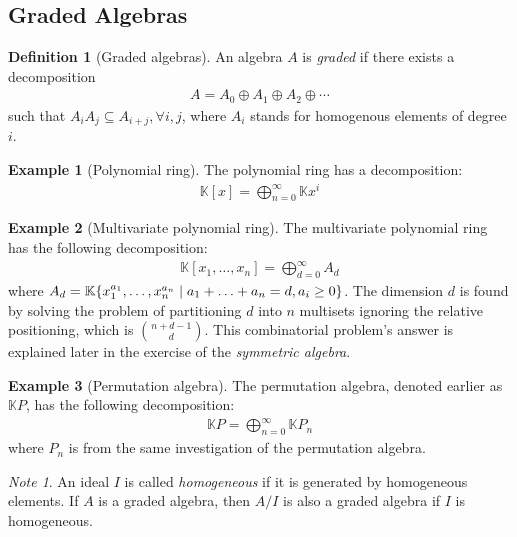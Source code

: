\documentclass{article}
\theoremstyle{definition}
\newtheorem{Definition}{Definition}
\newtheorem*{Example*}{Example}
\theoremstyle{remark}
\newtheorem*{Note*}{Note}
\theoremstyle{underline}
\theoremstyle{underline}
\begin{document}
	\subsection{Graded Algebras}

	\begin{Definition}[Graded algebras]
		An algebra $A$ is \emph{graded} if there exists a decomposition
		\begin{gather*}
			A = A_0 \oplus A_1 \oplus A_2 \oplus \cdots
		\end{gather*}
		such that $A_i A_j \subseteq A_{i+j}, \forall i,j$, where $A_i$ stands for homogenous elements of degree $i$.
	\end{Definition}

	\begin{Example*}[Polynomial ring]
		The polynomial ring has a decomposition:
		\begin{gather*}
			\mathbb K[x] = \bigoplus_{n=0}^{\infty} \mathbb K x^i
		\end{gather*}
	\end{Example*}

	\begin{Example*}[Multivariate polynomial ring]
		The multivariate polynomial ring has the following decomposition:
		\begin{gather*}
			\mathbb K[x_1,\ldots,x_n] = \bigoplus_{d=0}^{\infty} A_d
		\end{gather*}
		where $A_d = \mathbb K\qty{x_1^{a_1},\ldots, x_n^{a_n}\mid a_1 + \ldots + a_n = d, a_i \geq 0}$. The dimension $d$ is found by solving the problem of partitioning $d$ into $n$ multisets ignoring the relative positioning, which is $\binom{n+d-1}{d}$. This combinatorial problem's answer is explained later in the exercise of the \emph{symmetric algebra}.
	\end{Example*}

	\begin{Example*}[Permutation algebra]
		The permutation algebra, denoted earlier as $\mathbb KP$, has the following decomposition:
		\begin{gather*}
			\mathbb KP = \bigoplus_{n=0}^{\infty} \mathbb KP_n
		\end{gather*}
		where $P_n$ is from the same investigation of the permutation algebra.
	\end{Example*}

	\begin{Note*}
		An ideal $I$ is called \emph{homogeneous} if it is generated by homogeneous elements. If $A$ is a graded algebra, then $A/I$ is also a graded algebra if $I$ is homogeneous.
	\end{Note*}
\end{document}

